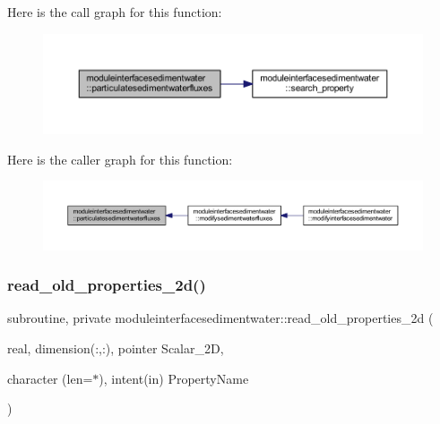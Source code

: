 Here is the call graph for this function\+:\nopagebreak
\begin{figure}[H]
\begin{center}
\leavevmode
\includegraphics[width=350pt]{namespacemoduleinterfacesedimentwater_a1ea77fd3a708c35c8d23bb864a94a0ad_cgraph}
\end{center}
\end{figure}
Here is the caller graph for this function\+:\nopagebreak
\begin{figure}[H]
\begin{center}
\leavevmode
\includegraphics[width=350pt]{namespacemoduleinterfacesedimentwater_a1ea77fd3a708c35c8d23bb864a94a0ad_icgraph}
\end{center}
\end{figure}
\mbox{\label{namespacemoduleinterfacesedimentwater_ae36783dede749530b40ad98b22316f39}} 
\subsubsection{\texorpdfstring{read\+\_\+old\+\_\+properties\+\_\+2d()}{read\_old\_properties\_2d()}}
{\footnotesize\ttfamily subroutine, private moduleinterfacesedimentwater\+::read\+\_\+old\+\_\+properties\+\_\+2d (\begin{DoxyParamCaption}\item[{real, dimension(\+:,\+:), pointer}]{Scalar\+\_\+2D,  }\item[{character (len=$\ast$), intent(in)}]{Property\+Name }\end{DoxyParamCaption})\hspace{0.3cm}{\ttfamily [private]}}

